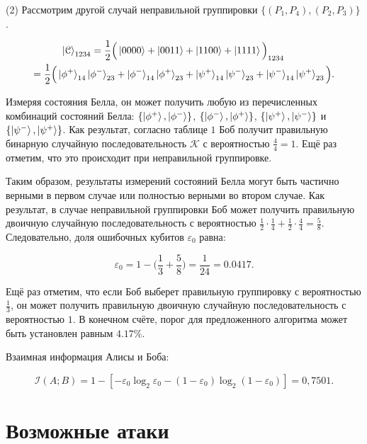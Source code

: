 \documentclass[a4paper,11pt]{article}
\begin{document}
(2) Рассмотрим другой случай неправильной группировки $\{(P_1, P_4), (P_2, P_3)\}$.

\begin{align*}
\ket{\mathcal{C}}_{1234} = \dfrac{1}{2} \Big(\ket{0000} + \ket{0011}
&+ \ket{1100} + \ket{1111} \Big)_{1234} \nonumber\\
 = \dfrac{1}{2} \Big(
\ket{\phi^+}_{14} \ket{\phi^-}_{23} + \ket{\phi^-}_{14} \ket{\phi^+}_{23} &+ 
\ket{\psi^+}_{14} \ket{\psi^-}_{23} + \ket{\psi^-}_{14} \ket{\psi^+}_{23} \Big).
\end{align*}

Измеряя состояния Белла, он может получить любую из перечисленных комбинаций состояний Белла: $\{\ket{\phi^+}, \ket{\phi^-}\}$, $\{\ket{\phi^-}, \ket{\phi^+}\}$, $\{\ket{\psi^+}, \ket{\psi^-}\}$ и $\{\ket{\psi^-}, \ket{\psi^+}\}$. Как результат, согласно таблице $1$ Боб получит правильную бинарную случайную последовательность $\mathcal{K}$ с вероятностью $\frac{4}{4} = 1$. Ещё раз отметим, что это происходит при неправильной группировке.

Таким образом, результаты измерений состояний Белла могут быть частично верными в первом случае или полностью верными во втором случае. Как результат, в случае неправильной группировки Боб может получить правильную двоичную случайную последовательность с вероятностью $\frac{1}{2} \cdot \frac{1}{4} + \frac{1}{2} \cdot \frac{4}{4} = \frac{5}{8}$. Следовательно, доля ошибочных кубитов $\varepsilon_0$ равна:

\begin{equation*}
\varepsilon_0 = 1 - \Big(\dfrac{1}{3} + \dfrac{5}{8}\Big) = \dfrac{1}{24} = 0.0417.
\end{equation*}

Ещё раз отметим, что если Боб выберет правильную группировку с вероятностью $\frac{1}{3}$, он может получить правильную двоичную случайную последовательность с вероятностью $1$. В конечном счёте, порог для предложенного алгоритма может быть установлен равным $4.17\%$.

Взаимная информация Алисы и Боба:

\begin{equation*}
\mathcal{I}(A; B) = 1 - [- \varepsilon_0 \log_2 \varepsilon_0 -(1-\varepsilon_0)\log_2(1-\varepsilon_0) ] = 0,7501.
\end{equation*}

\section{Возможные атаки}
\end{document}
